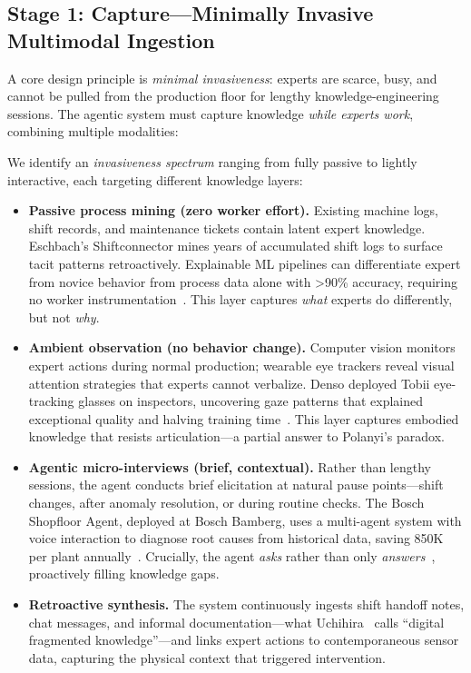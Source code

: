 \documentclass[]{ceurart}
\begin{document}
\subsection{Stage 1: Capture---Minimally Invasive Multimodal
  Ingestion}\label{sec:capture}

A core design principle is \emph{minimal invasiveness}: experts are
scarce, busy, and cannot be pulled from the production floor for lengthy
knowledge-engineering sessions. The agentic system must capture
knowledge \emph{while experts work}, combining multiple modalities:

We identify an \emph{invasiveness spectrum} ranging from fully passive
to lightly interactive, each targeting different knowledge layers:

\begin{itemize}
\item \textbf{Passive process mining (zero worker effort).}
  Existing machine logs, shift records, and maintenance tickets contain
  latent expert knowledge. Eschbach's Shiftconnector mines years of
  accumulated shift logs to surface tacit patterns retroactively.
  Explainable ML pipelines can differentiate expert from novice behavior
  from process data alone with {>}90\% accuracy, requiring no worker
  instrumentation~\cite{explainableml2024}. This layer captures
  \emph{what} experts do differently, but not \emph{why}.

\item \textbf{Ambient observation (no behavior change).} Computer
  vision monitors expert actions during normal production; wearable eye
  trackers reveal visual attention strategies that experts cannot
  verbalize. Denso deployed Tobii eye-tracking glasses on inspectors,
  uncovering gaze patterns that explained exceptional quality and halving
  training time~\cite{tobii2025}. This layer captures embodied knowledge
  that resists articulation---a partial answer to Polanyi's paradox.

\item \textbf{Agentic micro-interviews (brief, contextual).} Rather
  than lengthy sessions, the agent conducts brief elicitation at natural
  pause points---shift changes, after anomaly resolution, or during
  routine checks. The Bosch Shopfloor Agent, deployed at Bosch Bamberg,
  uses a multi-agent system with voice interaction to diagnose root
  causes from historical data, saving {\texteuro}850K per plant
  annually~\cite{bosch2025}. Crucially, the agent \emph{asks} rather
  than only \emph{answers}~\cite{najjar2025}, proactively filling
  knowledge gaps.

\item \textbf{Retroactive synthesis.} The system continuously ingests
  shift handoff notes, chat messages, and informal documentation---what
  Uchihira~\cite{uchihira2026} calls ``digital fragmented
  knowledge''---and links expert actions to contemporaneous sensor data,
  capturing the physical context that triggered intervention.
\end{itemize}
\end{document}
